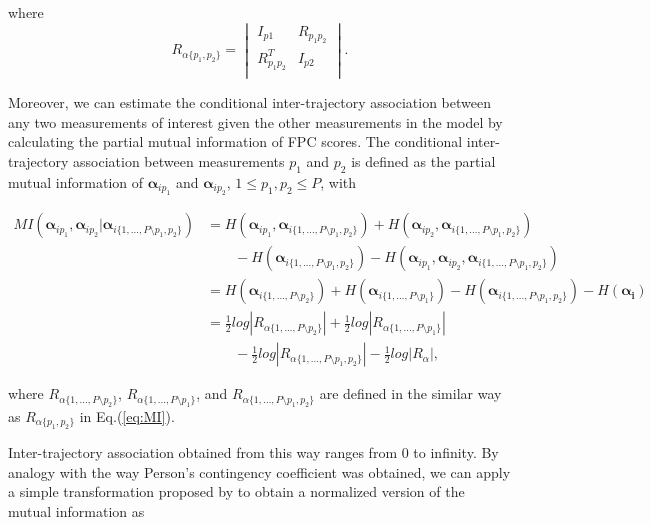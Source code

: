 \documentclass[aoas,preprint]{imsart}
\begin{document}
where 
\begin{equation*}
R_{\alpha\{p_1, p_2\}} = 
\begin{vmatrix} 
I_{p1} & R_{p_1 p_2} \\
R_{p_1 p_2}^T& I_{p2} \\
\end{vmatrix}.
\end{equation*}

Moreover, we can estimate the conditional inter-trajectory association between any two measurements of interest given the other measurements in the model by calculating the partial mutual information of FPC scores. The conditional inter-trajectory association between measurements $p_1$ and $p_2$ is defined as the partial mutual information of $\boldsymbol{\alpha}_{ip_1}$ and $\boldsymbol{\alpha}_{ip_2}$, $1 \leq p_1, p_2  \leq P$, with

\begin{equation}
\begin{aligned}
MI(\boldsymbol{\alpha}_{ip_1}, \boldsymbol{\alpha}_{ip_2} | \boldsymbol{\alpha}_{i\{1, ..., P \setminus p_1, p_2 \}})
&= H(\boldsymbol{\alpha}_{ip_1}, \boldsymbol{\alpha}_{i\{1, ..., P \setminus p_1, p_2 \}}) +  H(\boldsymbol{\alpha}_{ip_2}, \boldsymbol{\alpha}_{i\{1, ..., P \setminus p_1, p_2 \}}) \\
& \qquad- H(\boldsymbol{\alpha}_{i\{1, ..., P \setminus p_1, p_2 \}}) - H(\boldsymbol{\alpha}_{ip_1}, \boldsymbol{\alpha}_{ip_2} , \boldsymbol{\alpha}_{i\{1, ..., P \setminus p_1, p_2 \}}) \\
&= H( \boldsymbol{\alpha}_{i\{1,...,P \setminus p_2\}}) +  H(\boldsymbol{\alpha}_{i\{1,...,P \setminus p_1\}}) - H(\boldsymbol{\alpha}_{i\{1, ..., P \setminus p_1, p_2 \}}) - H(\boldsymbol{\alpha_i}) \\
&= \frac{1}{2} log|R_{\alpha \{1, ..., P \setminus p_2\}}| + \frac{1}{2} log|R_{\alpha \{1, ..., P \setminus p_1\}}| \\
& \qquad - \frac{1}{2} log|R_{\alpha \{1, ..., P \setminus p_1, p_2\}}| - \frac{1}{2} log|R_{\alpha }|,
\end{aligned}
\end{equation}

where $R_{\alpha \{1, ..., P \setminus p_2\}}$, $R_{\alpha \{1, ..., P \setminus p_1\}}$, and $R_{\alpha \{1, ..., P \setminus p_1, p_2\}}$ are defined in the similar way as $R_{\alpha \{p_1, p_2\}}$ in Eq.(\ref{eq:MI}). 

Inter-trajectory association obtained from this way ranges from 0 to infinity. By analogy with the way Person’s contingency coefficient was obtained, we can apply a simple transformation proposed by \citet{joe1989relative} to obtain a normalized version of the mutual information as
\end{document}
